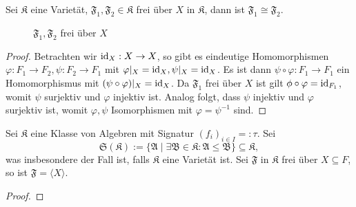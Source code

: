 \begin{proposition}
    Sei $\mathfrak{K}$ eine Varietät, $\mathfrak{F}_1, \mathfrak{F}_2 \in \mathfrak{K}$ frei über $X$ in $\mathfrak{K}$, dann ist $\mathfrak{F}_1 \cong \mathfrak{F}_2$.
\end{proposition}

\begin{figure}[H]
    \centering
    \caption{$\mathfrak{F}_1, \mathfrak{F}_2$ frei über $X$}
\end{figure}

\begin{proof}
    Betrachten wir $\operatorname{id}_X : X \to X$, so gibt es eindeutige Homomorphismen $\varphi : F_1 \to F_2, \psi : F_2 \to F_1$ mit $\varphi \vert_X = \operatorname{id}_X, \psi \vert_X = \operatorname{id}_X$. Es ist dann $\psi \circ \varphi : F_1 \to F_1$ ein Homomorphismus mit $(\psi \circ \varphi) \vert_X = \operatorname{id}_X$. Da $\mathfrak{F}_1$ frei über $X$ ist gilt $\phi \circ \varphi = \operatorname{id}_{F_1}$, womit $\psi$ surjektiv und $\varphi$ injektiv ist. Analog folgt, dass $\psi$ injektiv und $\varphi$ surjektiv ist, womit $\varphi, \psi$ Isomorphismen mit $\varphi = \psi^{-1}$ sind.
\end{proof}


\begin{proposition}
    Sei $\mathfrak{K}$ eine Klasse von Algebren mit Signatur $(f_i)_{i \in I} =: \tau$. Sei
    $$ \mathfrak{S}(\mathfrak{K}) := \{ \mathfrak{A} \mid \exists \mathfrak{B} \in \mathfrak{K}: \mathfrak{A} \leq \mathfrak{B} \} \subseteq \mathfrak{K}, $$
    was insbesondere der Fall ist, falls $\mathfrak{K}$ eine Varietät ist. Sei $\mathfrak{F}$ in $\mathfrak{K}$ frei über $X \subseteq F$, so ist $\mathfrak{F} = \langle X \rangle$.
\end{proposition}

\begin{proof}
    
\end{proof}